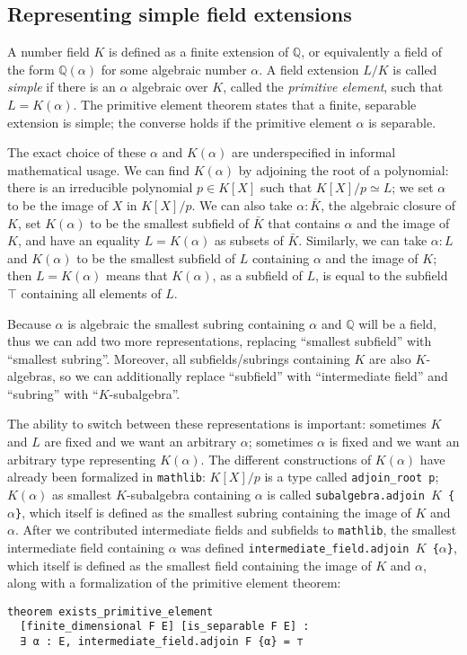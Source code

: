 \documentclass[a4paper,USenglish,cleveref, autoref, thm-restate]{lipics-v2021}
\newcommand{\lean}[1]{\texttt{#1}\xspace} %
\newcommand{\mathlib}{\texttt{mathlib}\xspace}
\newcommand{\Q}{\mathbb{Q}}
\begin{document}
\subsection{Representing simple field extensions}

A number field $K$ is defined as a finite extension of $\Q$, or equivalently a field of the form $\Q(\alpha)$ for some algebraic number $\alpha$.
A field extension $L / K$ is called \emph{simple} if there is an $\alpha$ algebraic over $K$, called the \emph{primitive element}, such that $L = K(\alpha)$.
The primitive element theorem states that a finite, separable extension is simple; the converse holds if the primitive element $\alpha$ is separable.

The exact choice of these $\alpha$ and $K(\alpha)$ are underspecified in informal mathematical usage.
We can find $K(\alpha)$ by adjoining the root of a polynomial: there is an irreducible polynomial $p \in K[X]$ such that $K[X] / p \simeq L$; we set $\alpha$ to be the image of $X$ in $K[X] / p$.
We can also take $\alpha : \bar{K}$, the algebraic closure of $K$, set $K(\alpha)$ to be the smallest subfield of $\bar{K}$ that contains $\alpha$ and the image of $K$, and have an equality $L = K(\alpha)$ as subsets of $\bar{K}$.
Similarly, we can take $\alpha : L$ and $K(\alpha)$ to be the smallest subfield of $L$ containing $\alpha$ and the image of $K$; then $L = K(\alpha)$ means that $K(\alpha)$, as a subfield of $L$, is equal to the subfield $\top$ containing all elements of $L$.

Because $\alpha$ is algebraic the smallest subring containing $\alpha$ and $\Q$ will be a field, thus we can add two more representations, replacing ``smallest subfield'' with ``smallest subring''.
Moreover, all subfields/subrings containing $K$ are also $K$-algebras, so we can additionally replace ``subfield'' with ``intermediate field'' and ``subring'' with ``$K$-subalgebra''.

The ability to switch between these representations is important: sometimes $K$ and $L$ are fixed and we want an arbitrary $\alpha$; sometimes $\alpha$ is fixed and we want an arbitrary type representing $K(\alpha)$.
The different constructions of $K(\alpha)$ have already been formalized in \mathlib:
$K[X] / p$ is a type called \lean{adjoin\_root p};
$K(\alpha)$ as smallest $K$-subalgebra containing $\alpha$ is called \lean{subalgebra.adjoin $K$ \{$\alpha$\}},
which itself is defined as the smallest subring containing the image of $K$ and $\alpha$.
After we contributed intermediate fields and subfields to \mathlib,
the smallest intermediate field containing $\alpha$ was defined \lean{intermediate\_field.adjoin $K$ \{$\alpha$\}},
which itself is defined as the smallest field containing the image of $K$ and $\alpha$,
along with a formalization of the primitive element theorem:
\begin{lstlisting}
theorem exists_primitive_element
  [finite_dimensional F E] [is_separable F E] :
  ∃ α : E, intermediate_field.adjoin F {α} = ⊤
\end{lstlisting}
\end{document}

